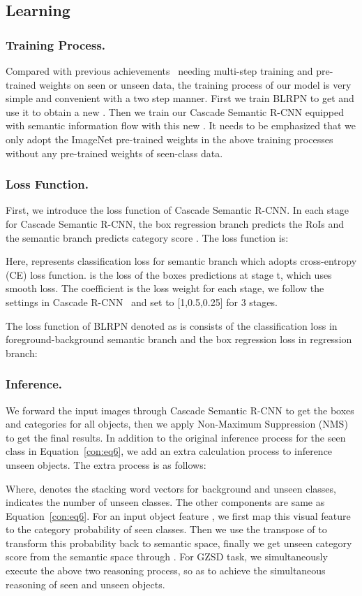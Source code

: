 \documentclass[runningheads]{llncs}
\begin{document}
\subsection{Learning}
\subsubsection{Training Process.}
Compared with previous achievements~\cite{bansal2018zero,demirel2018zero,rahman2018zero,zhu2019zero} needing multi-step training and pre-trained weights on seen or unseen data, the training process of our model is very simple and convenient with a two step manner. First we train BLRPN to get  and use it to obtain a new . Then we train our Cascade Semantic R-CNN equipped with semantic information flow with this new . It needs to be emphasized that we only adopt the ImageNet pre-trained weights in the above training processes without any pre-trained weights of seen-class data.
\subsubsection{Loss Function.}
First, we introduce the loss function of Cascade Semantic R-CNN. In each stage  for Cascade Semantic R-CNN, the box regression branch predicts the RoIs  and the semantic branch predicts category score . The loss function  is:

Here,  represents classification loss for semantic branch which adopts cross-entropy (CE) loss function.  is the loss of the boxes predictions at stage t, which uses smooth  loss. The coefficient  is the loss weight for each stage, we follow the settings in Cascade R-CNN~\cite{cascadercnn} and set  to [1,0.5,0.25] for 3 stages. 

The loss function of BLRPN denoted as  is consists of the classification loss  in foreground-background semantic branch and the box regression loss  in regression branch:

\subsubsection{Inference.}
We forward the input images through Cascade Semantic R-CNN to get the boxes and categories for all objects, then we apply Non-Maximum Suppression (NMS) to get the final results. In addition to the original inference process for the seen class in Equation~\ref{con:eq6}, we add an extra calculation process to inference unseen objects. The extra process is as follows:

Where,  denotes the stacking word vectors for background and unseen classes,  indicates the number of unseen classes. The other components are same as Equation~\ref{con:eq6}. For an input object feature , we first map this visual feature to the category probability of seen classes. Then we use the transpose of  to transform this probability back to semantic space, finally we get unseen category score from the semantic space through . For GZSD task, we simultaneously execute the above two reasoning process, so as to achieve the simultaneous reasoning of seen and unseen objects.
\end{document}
